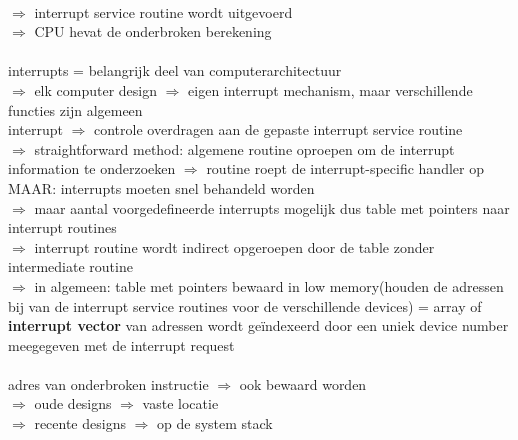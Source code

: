 \documentclass{report}
\begin{document}
\\$\Rightarrow$ interrupt service routine wordt uitgevoerd
\\$\Rightarrow$ CPU hevat de onderbroken berekening
\\
\\interrupts = belangrijk deel van computerarchitectuur
\\$\Rightarrow$ elk computer design $\Rightarrow$ eigen interrupt mechanism, maar verschillende functies zijn algemeen
\\interrupt $\Rightarrow$ controle overdragen aan de gepaste interrupt service routine
\\ $\Rightarrow$ straightforward method: algemene routine oproepen om de interrupt information te onderzoeken $\Rightarrow$ routine roept de interrupt-specific handler op
\\ MAAR: interrupts moeten snel behandeld worden
\\$\Rightarrow$ maar aantal voorgedefineerde interrupts mogelijk dus table met pointers naar interrupt routines
\\$\Rightarrow$ interrupt routine wordt indirect opgeroepen door de table zonder intermediate routine
\\$\Rightarrow$ in algemeen: table met pointers bewaard in low memory(houden de adressen bij van de interrupt service routines voor de verschillende devices) = array of \textbf{interrupt vector} van adressen wordt ge\"indexeerd door een uniek device number meegegeven met de interrupt request
\\
\\adres van onderbroken instructie $\Rightarrow$ ook bewaard worden
\\$\Rightarrow$ oude designs $\Rightarrow$ vaste locatie
\\$\Rightarrow$ recente designs $\Rightarrow$ op de system stack
\end{document}
